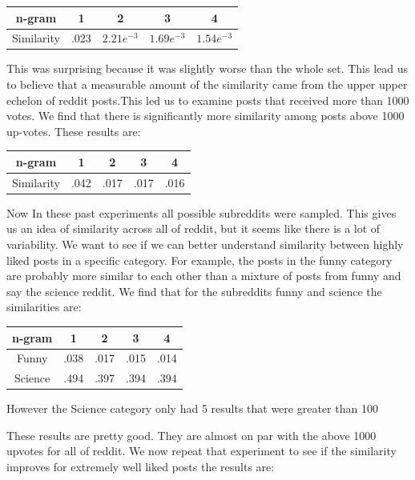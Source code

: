 \documentclass[12pt]{article}
\numberwithin{equation}{section}
\begin{document}
\begin{table}[h!]
	  \begin{tabular}{c | c c c c}
	  n-gram & 1 & 2 & 3 & 4\\
	  \hline
	  Similarity & .023 & $2.21e^{-3}$ & $1.69e^{-3}$ & $1.54e^{-3}$
	  \end{tabular}
	\end{table}
	This was surprising because it was slightly worse than the whole set.  This lead us to believe that a measurable amount of the similarity came from the upper upper echelon of reddit posts.This led us to examine posts that received more than 1000 votes.  We find that there is significantly more similarity among posts above 1000 up-votes.  These results are:\newline
	
	\begin{table}[h!]
	  \begin{tabular}{c | c c c c}
	  n-gram & 1 & 2 & 3 & 4\\
	  \hline
	  Similarity & .042 & .017 & .017 & .016
	  \end{tabular}
	\end{table}
	
	Now In these past experiments all possible subreddits were sampled.  This gives us an idea of similarity across all of reddit, but it seems like there is a lot of variability.  We want to see if we can better understand similarity between highly liked posts in a specific category.  For example, the posts in the funny category are probably more similar to each other than a mixture of posts from funny and say the science reddit.  We find that for the subreddits funny and science the similarities are:
	
		\begin{table}[h!]
	  \begin{tabular}{c | c c c c}
	  n-gram & 1 & 2 & 3 & 4\\
	  \hline
	  Funny & .038 & .017 & .015 & .014\\
	  Science & .494 & .397 & .394 & .394\\
	  \end{tabular}
	\end{table}
	However the Science category only had 5 results that were greater than 100
	
These results are pretty good.  They are almost on par with the above 1000 upvotes for all of reddit.  We now repeat that experiment to see if the similarity improves for extremely well liked posts the results are:
\end{document}

